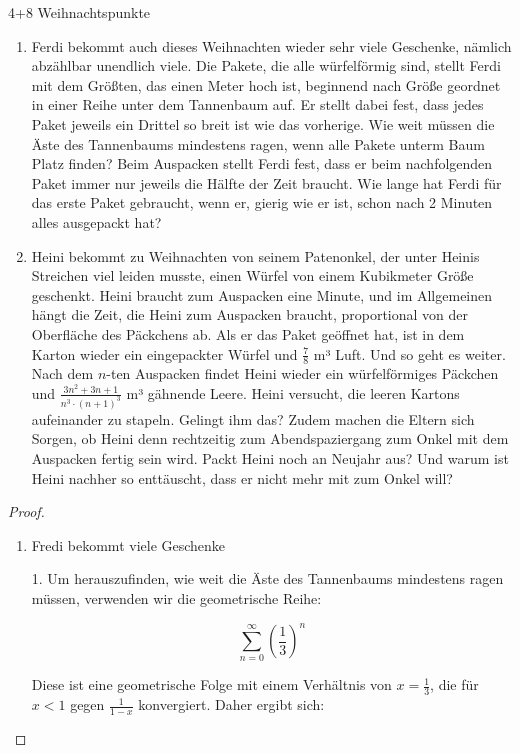 \documentclass{../problemset}
\begin{document}
\begin{problem}[Weihnachtsaufgaben*]{4+8 Weihnachtspunkte}
\begin{enumerate}
	\item Ferdi bekommt auch dieses Weihnachten wieder sehr viele Geschenke, nämlich abzählbar unendlich viele. Die Pakete, die alle
	      würfelförmig sind, stellt Ferdi mit dem Größten, das einen Meter hoch ist, beginnend nach Größe geordnet in einer Reihe unter dem
	      Tannenbaum auf. Er stellt dabei fest, dass jedes Paket jeweils ein Drittel so breit ist wie das vorherige. Wie weit müssen die
	      Äste des Tannenbaums mindestens ragen, wenn alle Pakete unterm Baum Platz finden? Beim Auspacken stellt Ferdi fest, dass er beim
	      nachfolgenden Paket immer nur jeweils die Hälfte der Zeit braucht. Wie lange hat Ferdi für das erste Paket gebraucht, wenn er,
	      gierig wie er ist, schon nach 2 Minuten alles ausgepackt hat?
	\item Heini bekommt zu Weihnachten von seinem Patenonkel, der unter Heinis Streichen viel leiden musste, einen Würfel von einem
	      Kubikmeter Größe geschenkt. Heini braucht zum Auspacken eine Minute, und im Allgemeinen hängt die Zeit, die Heini zum Auspacken
	      braucht, proportional von der Oberfläche des Päckchens ab. Als er das Paket geöffnet hat, ist in dem Karton wieder ein
	      eingepackter Würfel und $\frac{7}{8}$ m³ Luft. Und so geht es weiter. Nach dem $n$-ten Auspacken findet Heini wieder ein
	      würfelförmiges Päckchen und $\frac{3n^2+3n+1}{n^3\cdot(n+1)^3}$ m³ gähnende Leere. Heini versucht, die leeren Kartons aufeinander
	      zu stapeln. Gelingt ihm das? Zudem machen die Eltern sich Sorgen, ob Heini denn rechtzeitig zum Abendspaziergang zum Onkel mit
	      dem Auspacken fertig sein wird. Packt Heini noch an Neujahr aus? Und warum ist Heini nachher so enttäuscht, dass er nicht mehr
	      mit zum Onkel will?
\end{enumerate}

\begin{proof}
	$ $

	\begin{enumerate}
		\item Fredi bekommt viele Geschenke

		      1. Um herauszufinden, wie weit die Äste des Tannenbaums mindestens ragen müssen, verwenden wir die geometrische Reihe:

		      \[
			      \sum_{n=0}^{\infty} {\left(\frac{1}{3}\right)}^n
		      \]

		      Diese ist eine geometrische Folge mit einem Verhältnis von \(x = \frac{1}{3}\), die für \(x < 1\) gegen \(\frac{1}{1 - x}\)
		      konvergiert. Daher ergibt sich:


\end{enumerate}
\end{proof}
\end{problem}
\end{document}
